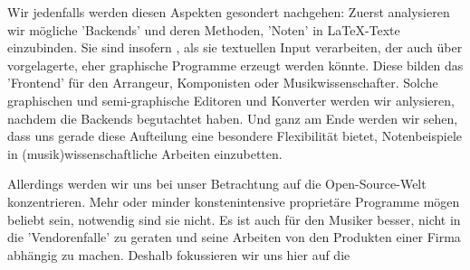 Wir jedenfalls werden diesen Aspekten gesondert nachgehen: Zuerst analysieren
wir mögliche 'Backends' und deren Methoden, 'Noten' in \LaTeX-Texte einzubinden.
Sie sind insofern , als sie textuellen Input verarbeiten, der auch
über vorgelagerte, eher graphische Programme erzeugt werden könnte. Diese bilden
das 'Frontend' für den Arrangeur, Komponisten oder Musikwissenschafter. Solche
graphischen und semi-graphische Editoren und Konverter werden wir anlysieren,
nachdem die Backends begutachtet haben. Und ganz am Ende werden wir sehen, dass
uns gerade diese Aufteilung eine besondere Flexibilität bietet, Notenbeispiele
in (musik)wissenschaftliche Arbeiten einzubetten.

Allerdings werden wir uns bei unser Betrachtung auf die Open-Source-Welt
konzentrieren. Mehr oder minder konstenintensive proprietäre Programme mögen
beliebt sein, notwendig sind sie nicht. Es ist auch für den Musiker besser,
nicht in die 'Vendorenfalle' zu geraten und seine Arbeiten von den Produkten
einer Firma abhängig zu machen. Deshalb fokussieren wir uns hier auf die
